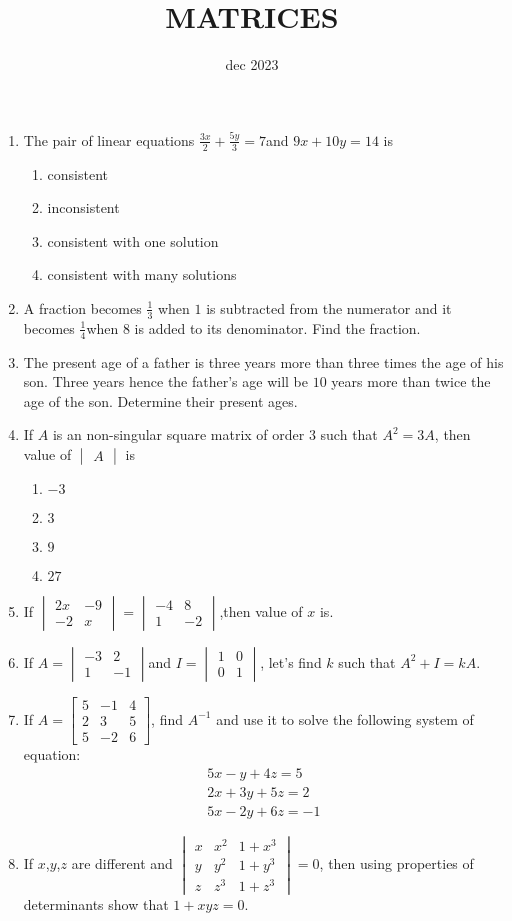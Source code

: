 \documentclass[12pt,-letter paper]{article}
\title{MATRICES}
\author{}
\date{dec 2023}
\providecommand{\mydet}[1]{\ensuremath{\begin{vmatrix}#1\end{vmatrix}}}
\providecommand{\myvec}[1]{\ensuremath{\begin{bmatrix}#1\end{bmatrix}}}
\begin{document}
\maketitle

\begin{enumerate}
\item The pair of linear equations
$\frac{3x}{2}+\frac{5y}{3}=7 $and $9x+10y=14$ is
\begin{enumerate}[label=(\alph*)]
\item consistent
\item inconsistent
\item consistent with one solution 
\item consistent with many solutions 
\end{enumerate}


\item A fraction becomes $\frac{1}{3}$ when $1$ is subtracted from the numerator and it becomes $\frac{1}{4}$when $8$ is  added to its denominator. Find the fraction.


\item The present age of a father is three years more than three times the age of his son. Three years hence the father's age will be $10$ years more than twice the age of the son. Determine their present ages.

\item If $A$ is an non-singular square matrix  of order $3$ such that $A^2=3A$, then value of $\mydet{A}$ is\\
\begin{enumerate}[label=(\alph*)]
\item $-3$
\item $3$
\item $9$
\item $27$
\end{enumerate}

\item If $\mydet{2x &-9\\ -2 &x} = \mydet{-4 &8\\ 1 &-2}$,then value of $x$ is. 
		
\item If  $A = \mydet{ -3 & 2 \\ 1 & -1}$and $I = \mydet{1 & 0 \\ 0 & 1 }$, let's find $k$ such that $A^2 + I = kA$.

	\item If $A= \myvec{5 & -1 & 4\\ 2 & 3 & 5\\  5 & -2 & 6 }$, find $A^{-1}$ and use it to solve the following system of equation: 
		\begin{align}
			5x-y+4z=5\\
			2x+3y+5z=2\\
			5x-2y+6z=-1
		\end{align}
	\item If $x$,$y$,$z$ are different and $\mydet{x & x^{2} & 1+x^{3}\\y & y^{2} & 1+y^{3}\\z & z^{3} & 1+z^{3}} =0$, then using properties of determinants show that $1+xyz=0$.



\end{enumerate}
\end{document}
